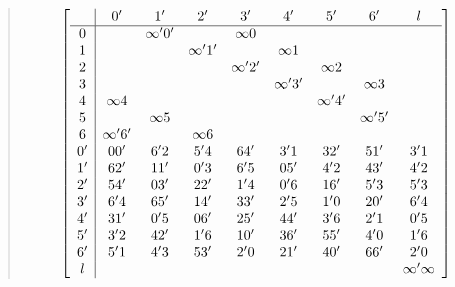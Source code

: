 \documentclass[
  11pt,
  a4paper]{book}
\begin{document}
\begin{quote}
\begin{equation}
  \left[\begin{array}{c|*{8}c}
       &        0'      &       1'       &      2'       &      3'      &        4'       &       5'       &       6'       &         l  \\ \hline
    0  &                &   \infty ' 0'  &               &   \infty 0   &                 &                &                &            \\ 
    1  &                &                &  \infty ' 1'  &              &     \infty 1    &                &                &            \\
    2  &                &                &               &  \infty ' 2' &                 &    \infty 2    &                &            \\
    3  &                &                &               &              &   \infty ' 3 '  &                &    \infty 3    &            \\ 
    4  &    \infty  4   &                &               &              &                 &  \infty ' 4 '  &                &            \\
    5  &                &   \infty  5    &               &              &                 &                &  \infty ' 5 '  &            \\
    6  &   \infty ' 6 ' &                &   \infty 6    &              &                 &                &                &            \\
    0' &       00'      &       6'2      &      5'4      &      64'     &       3'1       &      32'       &      51'        &       3'1 \\
    1' &       62'      &       11'      &      0'3      &      6'5     &       05'       &      4'2       &      43'        &       4'2 \\
    2' &       54'      &       03'      &      22'      &      1'4     &       0'6       &      16'       &      5'3        &       5'3 \\
    3' &       6'4      &       65'      &      14'      &      33'     &       2'5       &      1'0       &      20'        &       6'4 \\
    4' &       31'      &       0'5      &      06'      &      25'     &       44'       &      3'6       &      2'1        &       0'5 \\
    5' &       3'2      &       42'      &      1'6      &      10'     &       36'       &      55'       &      4'0        &       1'6 \\
    6' &       5'1      &       4'3      &      53'      &      2'0     &       21'       &      40'       &      66'        &       2'0 \\
    l  &                &                &               &              &                 &                &                 & \infty ' \infty \\ 
  \end{array}\right]
\end{equation}


\end{quote}
\end{document}
